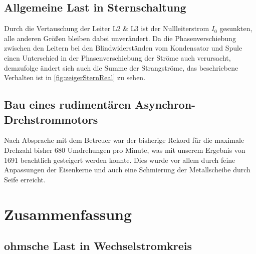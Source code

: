 \documentclass[12pt,english,ngerman]{scrartcl}
\begin{document}
\subsection{Allgemeine Last in Sternschaltung}
Durch die Vertauschung der Leiter L2 \& L3 ist der Nullleiterstrom $I_0$
gesunkten, alle anderen Größen bleiben dabei unverändert. Da die
Phasenverschiebung zwischen den Leitern bei den Blindwiderständen vom
Kondensator und Spule einen Unterschied in der Phasenverschiebung der Ströme
auch verursacht, demzufolge ändert sich auch die Summe der Strangströme, das
beschriebene Verhalten ist in \autoref{fig:zeigerSternReal} zu sehen.


\subsection{Bau eines rudimentären Asynchron-Drehstrommotors}

Nach Absprache mit dem Betreuer war der bisherige Rekord für die maximale
Drehzahl bisher 680 Umdrehungen pro Minute, was mit unserem Ergebnis von 1691
beachtlich gesteigert werden konnte. Dies wurde vor allem durch feine
Anpassungen der Eisenkerne und auch eine Schmierung der Metallscheibe durch
Seife erreicht.

\section{Zusammenfassung}\label{sec:zusammenfassung}

\subsection{ohmsche Last in Wechselstromkreis}
\end{document}
